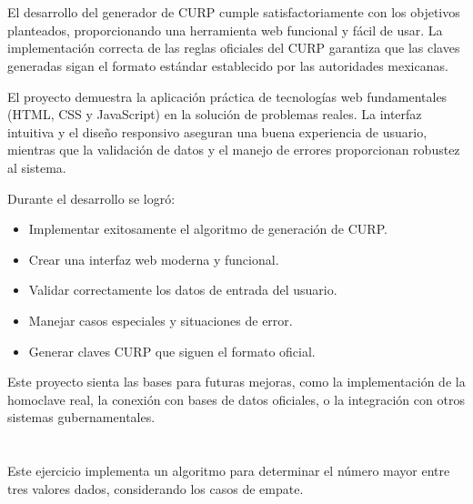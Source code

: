 \documentclass[10pt,a4paper]{article}
\begin{document}
\pagebreak

\section{\color{colorIPN}{Conclusiones}}
El desarrollo del generador de CURP cumple satisfactoriamente con los objetivos planteados, proporcionando una herramienta web funcional y fácil de usar. La implementación correcta de las reglas oficiales del CURP garantiza que las claves generadas sigan el formato estándar establecido por las autoridades mexicanas.

El proyecto demuestra la aplicación práctica de tecnologías web fundamentales (HTML, CSS y JavaScript) en la solución de problemas reales. La interfaz intuitiva y el diseño responsivo aseguran una buena experiencia de usuario, mientras que la validación de datos y el manejo de errores proporcionan robustez al sistema.

Durante el desarrollo se logró:
\begin{itemize}
	\item Implementar exitosamente el algoritmo de generación de CURP.
	\item Crear una interfaz web moderna y funcional.
	\item Validar correctamente los datos de entrada del usuario.
	\item Manejar casos especiales y situaciones de error.
	\item Generar claves CURP que siguen el formato oficial.
\end{itemize}

Este proyecto sienta las bases para futuras mejoras, como la implementación de la homoclave real, la conexión con bases de datos oficiales, o la integración con otros sistemas gubernamentales.


\pagebreak

\section{\color{colorIPN}{Ejercicio 43: Número Mayor de Tres}}
Este ejercicio implementa un algoritmo para determinar el número mayor entre tres valores dados, considerando los casos de empate.
\end{document}
